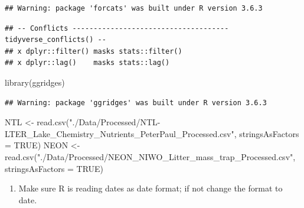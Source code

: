 \documentclass[]{article}
\newenvironment{Shaded}{\begin{snugshade}}{\end{snugshade}}
\newcommand{\AttributeTok}[1]{\textcolor[rgb]{0.77,0.63,0.00}{#1}}
\newcommand{\CommentTok}[1]{\textcolor[rgb]{0.56,0.35,0.01}{\textit{#1}}}
\newcommand{\ConstantTok}[1]{\textcolor[rgb]{0.00,0.00,0.00}{#1}}
\newcommand{\FunctionTok}[1]{\textcolor[rgb]{0.00,0.00,0.00}{#1}}
\newcommand{\NormalTok}[1]{#1}
\newcommand{\OtherTok}[1]{\textcolor[rgb]{0.56,0.35,0.01}{#1}}
\newcommand{\SpecialCharTok}[1]{\textcolor[rgb]{0.00,0.00,0.00}{#1}}
\newcommand{\StringTok}[1]{\textcolor[rgb]{0.31,0.60,0.02}{#1}}
\providecommand{\tightlist}{%
  \setlength{\itemsep}{0pt}\setlength{\parskip}{0pt}}
\begin{document}
\begin{verbatim}
## Warning: package 'forcats' was built under R version 3.6.3
\end{verbatim}

\begin{verbatim}
## -- Conflicts ------------------------------------- tidyverse_conflicts() --
## x dplyr::filter() masks stats::filter()
## x dplyr::lag()    masks stats::lag()
\end{verbatim}

\begin{Shaded}
\begin{Highlighting}[]
\FunctionTok{library}\NormalTok{(ggridges)}
\end{Highlighting}
\end{Shaded}

\begin{verbatim}
## Warning: package 'ggridges' was built under R version 3.6.3
\end{verbatim}

\begin{Shaded}
\begin{Highlighting}[]
\NormalTok{NTL }\OtherTok{\textless{}{-}} 
  \FunctionTok{read.csv}\NormalTok{(}\StringTok{"./Data/Processed/NTL{-}LTER\_Lake\_Chemistry\_Nutrients\_PeterPaul\_Processed.csv"}\NormalTok{, }
           \AttributeTok{stringsAsFactors =} \ConstantTok{TRUE}\NormalTok{)}
\NormalTok{NEON }\OtherTok{\textless{}{-}}
  \FunctionTok{read.csv}\NormalTok{(}\StringTok{"./Data/Processed/NEON\_NIWO\_Litter\_mass\_trap\_Processed.csv"}\NormalTok{, }\AttributeTok{stringsAsFactors =} \ConstantTok{TRUE}\NormalTok{)}
\end{Highlighting}
\end{Shaded}

\begin{enumerate}
\def\labelenumi{\arabic{enumi}.}
\setcounter{enumi}{1}
\tightlist
\item
  Make sure R is reading dates as date format; if not change the format
  to date.
\end{enumerate}

\begin{Shaded}
\end{Shaded}
\end{document}
